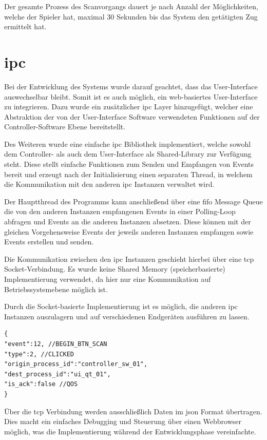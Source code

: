 Der gesamte Prozess des Scanvorgangs dauert je nach Anzahl der
Möglichkeiten, welche der Spieler hat, maximal 30 Sekunden bis das
System den getätigten Zug ermittelt hat.

\hypertarget{ipc}{%
\section{\texorpdfstring{\gls{ipc}}{}}\label{ipc}}

Bei der Entwicklung des Systems wurde darauf geachtet, dass das
User-Interface auswechselbar bleibt. Somit ist es auch möglich, ein
web-basiertes User-Interface zu integrieren. Dazu wurde ein zusätzlicher
\gls{ipc} Layer hinzugefügt, welcher eine Abstraktion der von der
User-Interface Software verwendeten Funktionen auf der
Controller-Software Ebene bereitstellt.

Des Weiteren wurde eine einfache \gls{ipc} Bibliothek implementiert,
welche sowohl dem Controller- als auch dem User-Interface als
Shared-Library zur Verfügung steht. Diese stellt einfache Funktionen zum
Senden und Empfangen von Events bereit und erzeugt nach der
Initialisierung einen separaten Thread, in welchem die Kommunikation mit
den anderen \gls{ipc} Instanzen verwaltet wird.

Der Hauptthread des Programms kann anschließend über eine \gls{fifo}
Message Queue die von den anderen Instanzen empfangenen Events in einer
Polling-Loop abfragen und Events an die anderen Instanzen absetzen.
Diese können mit der gleichen Vorgehensweise Events der jeweils anderen
Instanzen empfangen sowie Events erstellen und senden.

Die Kommunikation zwischen den \gls{ipc} Instanzen geschieht hierbei
über eine \gls{tcp} Socket-Verbindung. Es wurde keine Shared Memory
(speicherbasierte) Implementierung verwendet, da hier nur eine
Kommunikation auf Betriebssystemebene möglich ist.

Durch die Socket-basierte Implementierung ist es möglich, die anderen
\gls{ipc} Instanzen auszulagern und auf verschiedenen Endgeräten
ausführen zu lassen.

\begin{lstlisting}
{
"event":12, //BEGIN_BTN_SCAN
"type":2, //CLICKED
"origin_process_id":"controller_sw_01",
"dest_process_id":"ui_qt_01",
"is_ack":false //QOS
}
\end{lstlisting}

Über die \gls{tcp} Verbindung werden ausschließlich Daten im \gls{json}
Format übertragen. Dies macht ein einfaches Debugging und Steuerung über
einen Webbrowser möglich, was die Implementierung während der
Entwicklungsphase vereinfachte.

